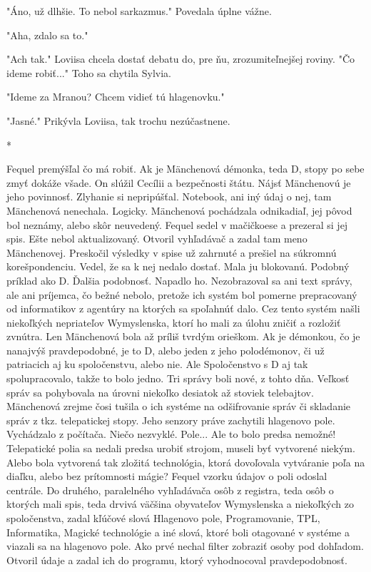 \documentclass{book}
\begin{document}
"$ $Áno, už dlhšie. To nebol sarkazmus."$ $  Povedala úplne vážne.

"$ $Aha, zdalo sa to."$ $ 

"$ $Ach tak."$ $  Loviisa chcela dostať debatu do, pre ňu, zrozumiteľnejšej roviny. "$ $Čo ideme robiť..."$ $  Toho sa chytila Sylvia.

"$ $Ideme za Mranou? Chcem vidieť tú hlagenovku."$ $ 

"$ $Jasné."$ $  Prikývla Loviisa, tak trochu nezúčastnene.

\begin{center}

*

\end{center}

Fequel premýšľal čo má robiť. Ak je Mänchenová démonka, teda D, stopy po sebe zmyť dokáže všade. On slúžil Cecílii a bezpečnosti štátu. Nájsť Mänchenovú je jeho povinnosť. Zlyhanie si nepripúšťal. Notebook, ani iný údaj o nej, tam Mänchenová nenechala. Logicky. Mänchenová pochádzala odnikadiaľ, jej pôvod bol neznámy, alebo skôr neuvedený. Fequel sedel v mačičkoese a prezeral si jej spis. Ešte nebol aktualizovaný. Otvoril vyhľadávač a zadal tam meno Mänchenovej. Preskočil výsledky v spise už zahrnuté a prešiel na súkromnú korešpondenciu. Vedel, že sa k nej nedalo dostať. Mala ju blokovanú. Podobný príklad ako D. Ďalšia podobnosť. Napadlo ho. Nezobrazoval sa ani text správy, ale ani príjemca, čo bežné nebolo, pretože ich systém bol pomerne prepracovaný od informatikov z agentúry na ktorých sa spoľahnúť dalo. Cez tento systém našli niekoľkých nepriateľov Wymyslenska, ktorí ho mali za úlohu zničiť a rozložiť zvnútra. Len Mänchenová bola až príliš tvrdým orieškom. Ak je démonkou, čo je nanajvýš pravdepodobné, je to D, alebo jeden z jeho polodémonov, či už patriacich aj ku spoločenstvu, alebo nie. Ale Spoločenstvo s D aj tak spolupracovalo, takže to bolo jedno. Tri správy boli nové, z tohto dňa. Veľkosť správ sa pohybovala na úrovni niekoľko desiatok až stoviek telebajtov. Mänchenová zrejme čosi tušila o ich systéme na odšifrovanie správ či skladanie správ z tkz. telepatickej stopy. Jeho senzory práve zachytili hlagenovo pole. Vychádzalo z počítača. Niečo nezvyklé. Pole... Ale to bolo predsa nemožné! Telepatické polia sa nedali predsa urobiť strojom, museli byť vytvorené niekým. Alebo bola vytvorená tak zložitá technológia, ktorá dovoľovala vytváranie poľa na diaľku, alebo bez prítomnosti mágie? Fequel vzorku údajov o poli odoslal centrále. Do druhého, paralelného vyhľadávača osôb z registra, teda osôb o ktorých mali spis, teda drvivá väčšina obyvateľov Wymyslenska a niekoľkých zo spoločenstva, zadal kľúčové slová Hlagenovo pole, Programovanie, TPL, Informatika, Magické technológie a iné slová, ktoré boli otagované v systéme a viazali sa na hlagenovo pole. Ako prvé nechal filter zobraziť osoby pod dohľadom. Otvoril údaje a zadal ich do programu, ktorý vyhodnocoval pravdepodobnosť.
\end{document}
